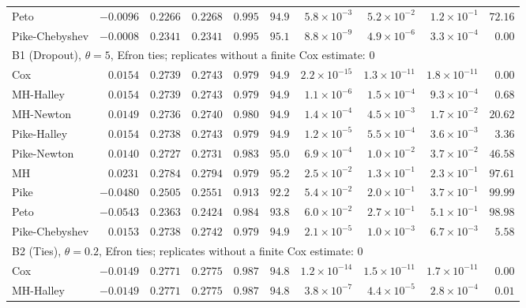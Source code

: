 \begin{landscape}
\begin{longtable}{lrrrrrrrrr}
Peto & $-0.0096$ & $0.2266$ & $0.2268$ & $0.995$ & $94.9$ & $5.8 \times 10^{-3}$ & $5.2 \times 10^{-2}$ & $1.2 \times 10^{-1}$ & $72.16$ \\
Pike-Chebyshev & $-0.0008$ & $0.2341$ & $0.2341$ & $0.995$ & $95.1$ & $8.8 \times 10^{-9}$ & $4.9 \times 10^{-6}$ & $3.3 \times 10^{-4}$ & $0.00$ \\
\multicolumn{10}{l}{B1 (Dropout), $\theta = 5$, Efron ties; replicates without a finite Cox estimate: 0} \\
Cox & $0.0154$ & $0.2739$ & $0.2743$ & $0.979$ & $94.9$ & $2.2 \times 10^{-15}$ & $1.3 \times 10^{-11}$ & $1.8 \times 10^{-11}$ & $0.00$ \\
MH-Halley & $0.0154$ & $0.2739$ & $0.2743$ & $0.979$ & $94.9$ & $1.1 \times 10^{-6}$ & $1.5 \times 10^{-4}$ & $9.3 \times 10^{-4}$ & $0.68$ \\
MH-Newton & $0.0149$ & $0.2736$ & $0.2740$ & $0.980$ & $94.9$ & $1.4 \times 10^{-4}$ & $4.5 \times 10^{-3}$ & $1.7 \times 10^{-2}$ & $20.62$ \\
Pike-Halley & $0.0154$ & $0.2738$ & $0.2743$ & $0.979$ & $94.9$ & $1.2 \times 10^{-5}$ & $5.5 \times 10^{-4}$ & $3.6 \times 10^{-3}$ & $3.36$ \\
Pike-Newton & $0.0140$ & $0.2727$ & $0.2731$ & $0.983$ & $95.0$ & $6.9 \times 10^{-4}$ & $1.0 \times 10^{-2}$ & $3.7 \times 10^{-2}$ & $46.58$ \\
MH & $0.0231$ & $0.2784$ & $0.2794$ & $0.979$ & $95.2$ & $2.5 \times 10^{-2}$ & $1.3 \times 10^{-1}$ & $2.3 \times 10^{-1}$ & $97.61$ \\
Pike & $-0.0480$ & $0.2505$ & $0.2551$ & $0.913$ & $92.2$ & $5.4 \times 10^{-2}$ & $2.0 \times 10^{-1}$ & $3.7 \times 10^{-1}$ & $99.99$ \\
Peto & $-0.0543$ & $0.2363$ & $0.2424$ & $0.984$ & $93.8$ & $6.0 \times 10^{-2}$ & $2.7 \times 10^{-1}$ & $5.1 \times 10^{-1}$ & $98.98$ \\
Pike-Chebyshev & $0.0153$ & $0.2738$ & $0.2742$ & $0.979$ & $94.9$ & $2.1 \times 10^{-5}$ & $1.0 \times 10^{-3}$ & $6.7 \times 10^{-3}$ & $5.58$ \\
\multicolumn{10}{l}{B2 (Ties), $\theta = 0.2$, Efron ties; replicates without a finite Cox estimate: 0} \\
Cox & $-0.0149$ & $0.2771$ & $0.2775$ & $0.987$ & $94.8$ & $1.2 \times 10^{-14}$ & $1.5 \times 10^{-11}$ & $1.7 \times 10^{-11}$ & $0.00$ \\
MH-Halley & $-0.0149$ & $0.2771$ & $0.2775$ & $0.987$ & $94.8$ & $3.8 \times 10^{-7}$ & $4.4 \times 10^{-5}$ & $2.8 \times 10^{-4}$ & $0.01$ \\

\end{longtable}
\end{landscape}
